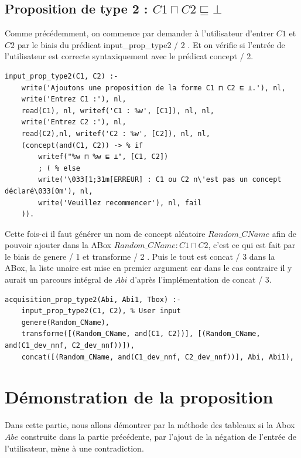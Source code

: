 \documentclass{article}
\begin{document}
\subsection{Proposition de type 2 : $ C1 \sqcap C2 \sqsubseteq \bot $ }
Comme précédemment, on commence par demander à l'utilisateur d'entrer $ C1 $ et $ C2 $ par le biais du prédicat \color{blue} input\_prop\_type2 / 2 \color{black}. Et on vérifie si l'entrée de l'utilisateur est correcte syntaxiquement avec le prédicat \color{blue}concept / 2\color{black}.
\begin{verbatim}
input_prop_type2(C1, C2) :-
    write('Ajoutons une proposition de la forme C1 ⊓ C2 ⊑ ⊥.'), nl,
    write('Entrez C1 :'), nl, 
    read(C1), nl, writef('C1 : %w', [C1]), nl, nl,
    write('Entrez C2 :'), nl, 
    read(C2),nl, writef('C2 : %w', [C2]), nl, nl,
    (concept(and(C1, C2)) -> % if 
        writef("%w ⊓ %w ⊑ ⊥", [C1, C2])
        ; ( % else
        write('\033[1;31m[ERREUR] : C1 ou C2 n\'est pas un concept déclaré\033[0m'), nl,
        write('Veuillez recommencer'), nl, fail
    )).
\end{verbatim}
Cette fois-ci il faut générer un nom de concept aléatoire $ Random\_CName $ afin de pouvoir ajouter dans la ABox $ Random\_CName : C1 \sqcap C2 $, c'est ce qui est fait par le biais de \color{blue} genere / 1 \color{black} et \color{blue} transforme / 2 \color{black}. Puis le tout est \color{blue} concat / 3 \color{black} dans la ABox, la liste unaire est mise en premier argument car dans le cas contraire il y aurait un parcours intégral de $Abi$ d'après l'implémentation de \color{blue}concat / 3\color{black}.
\begin{verbatim}
acquisition_prop_type2(Abi, Abi1, Tbox) :- 
    input_prop_type2(C1, C2), % User input
    genere(Random_CName),
    transforme([(Random_CName, and(C1, C2))], [(Random_CName, and(C1_dev_nnf, C2_dev_nnf))]), 
    concat([(Random_CName, and(C1_dev_nnf, C2_dev_nnf))], Abi, Abi1), 
\end{verbatim}

\section{Démonstration de la proposition}
Dans cette partie, nous allons démontrer par la méthode des tableaux si la Abox $ Abe $ construite dans la partie précédente, par l'ajout de la négation de l'entrée de l'utilisateur, mène à une contradiction.
\end{document}
